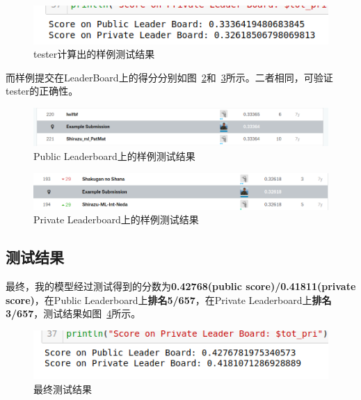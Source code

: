 \documentclass[12pt]{article} %
\begin{document}
\begin{sloppypar}
\begin{figure}[htbp]
	\centering
	\includegraphics[width=0.85\linewidth]{figure/sample.png}
	\caption{tester计算出的样例测试结果}
	\label{fig:sample}
\end{figure}

而样例提交在LeaderBoard上的得分分别如图~\ref{fig:public}和~\ref{fig:private}所示。二者相同，可验证tester的正确性。

\begin{figure}[htbp]
	\centering
	\includegraphics[width=\linewidth]{figure/public.png}
	\caption{Public Leaderboard上的样例测试结果}
	\label{fig:public}
\end{figure}

\begin{figure}[htbp]
	\centering
	\includegraphics[width=\linewidth]{figure/private.png}
	\caption{Private Leaderboard上的样例测试结果}
	\label{fig:private}
\end{figure}


\subsection{测试结果}

最终，我的模型经过测试得到的分数为{\bf 0.42768(public score)/0.41811(private score)}，在Public Leaderboard上{\bf 排名5/657}，在Private Leaderboard上{\bf 排名3/657}，测试结果如图~\ref{fig:test}所示。

\begin{figure}[htbp]
	\centering
	\includegraphics[width=0.85\linewidth]{figure/final.png}
	\caption{最终测试结果}
	\label{fig:test}
\end{figure}


\end{sloppypar}
\end{document}
